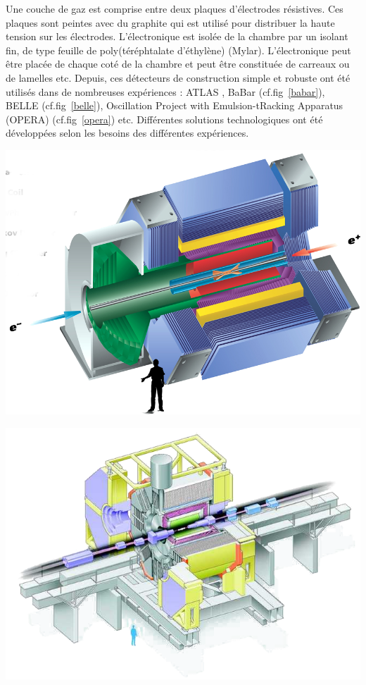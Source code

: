 Une couche de gaz est comprise entre deux plaques d'électrodes résistives. Ces plaques sont peintes avec du graphite qui est utilisé pour distribuer la haute tension sur les électrodes. L'électronique est isolée de la chambre par un isolant fin, de type feuille de poly(téréphtalate d'éthylène) (Mylar). L'électronique peut être placée de chaque coté de la chambre et peut être constituée de carreaux ou de lamelles etc.
Depuis, ces détecteurs de construction simple et robuste ont été utilisés dans de nombreuses expériences : ATLAS \cite{ATLAS}, BaBar \cite{Boutigny:1995ib} (cf.fig~\ref{babar}), BELLE \cite{ABASHIAN2002117} (cf.fig~\ref{belle}),  Oscillation Project with Emulsion-tRacking Apparatus (OPERA) \cite{1748-0221-9-10-C10003} (cf.fig~\ref{opera}) etc. Différentes solutions technologiques ont été développées selon les besoins des différentes expériences.

\marginpar
{
	\centering
	\includegraphics[width=\marginparwidth]{RPC/babar.png}
	\label{babar}
}

\marginpar
{
	\centering
	\includegraphics[width=\marginparwidth]{RPC/belle.png}
	\label{belle}
}

